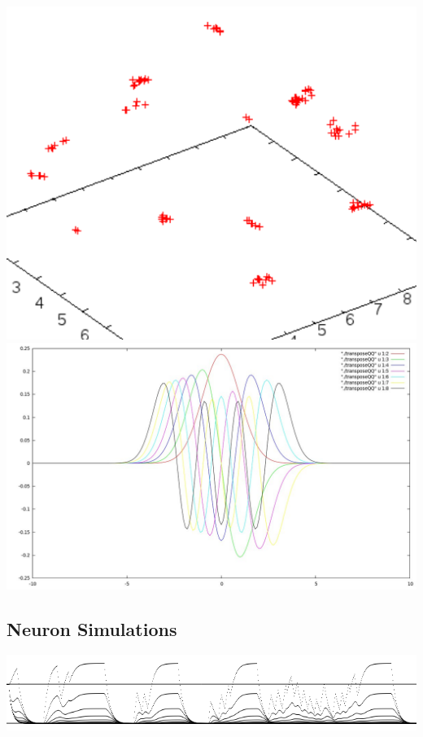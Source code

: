 \documentclass[../r.tex]{subfiles}
\begin{document}
\noindent
\includegraphics[scale=0.3]{../scientific/mdpos.png} 
\includegraphics[scale=0.15]{../scientific/quantumHO.png} 


\newpage
\subsection{Neuron Simulations}
\includegraphics[scale=0.5]{../scientific/potential.png}
\end{document}
